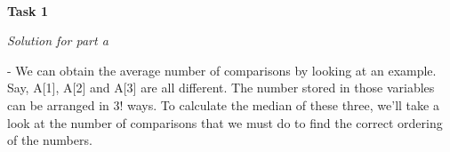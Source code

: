 \documentclass[11pt]{article}
\begin{document}
{\Large
\begin{center}

{}~\\
\vspace{0.25cm}
\end{center}
}

\medskip

\medskip

{\bf Task 1}

\textit{Solution for part a}

\medskip

- We can obtain the average number of comparisons by looking at an example. Say, A[1], A[2] and A[3] are all different. The number stored in those variables can be arranged in 3! ways.
To calculate the median of these three, we'll take a look at the number of comparisons that we must do to find the correct ordering of the numbers. 
\end{document}
